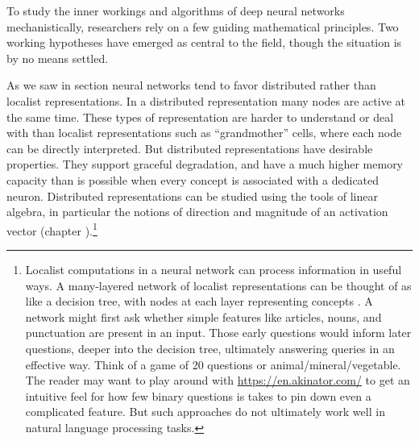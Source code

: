 To study the inner workings and algorithms of deep neural networks
mechanistically, researchers rely on a few guiding mathematical principles. Two
working hypotheses have emerged as central to the field, though the situation
is by no means settled.


As we saw in section  neural networks tend to
favor distributed rather than localist representations. In a distributed
representation many nodes are active at the same time. These types of
representation are harder to understand or deal with than localist
representations such as ``grandmother'' cells, where each node can be directly
interpreted. But distributed  representations have desirable properties. They
support graceful degradation, and have a much higher memory capacity than is
possible when every concept is associated with a dedicated neuron.  Distributed
representations can be studied using the tools of linear algebra, in particular
the notions of direction and magnitude of an activation vector (chapter
).\footnote{Localist computations in a neural network
can process information in useful ways. A many-layered network of localist
representations can be thought of as like a decision tree, with nodes at each
layer representing concepts . A network might first ask whether simple features
like articles, nouns, and punctuation are present in an input. Those early
questions would inform later questions, deeper into the decision tree,
ultimately answering queries in an effective way. Think of a game of 20
questions or animal/mineral/vegetable. The reader may want to play around with
\url{https://en.akinator.com/} to get an intuitive feel for how few binary
questions is takes to pin down even a complicated feature. But such approaches
do not ultimately work well in natural language processing tasks.} 

